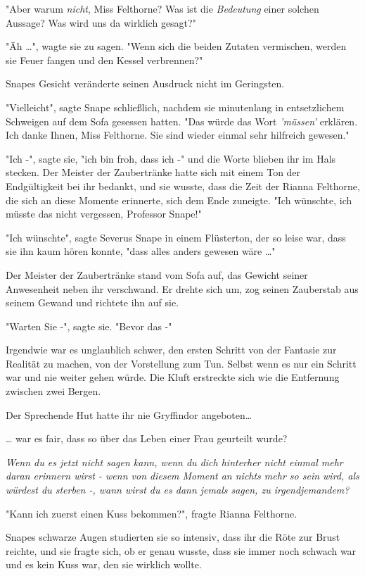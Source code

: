 {"Aber warum \emph{nicht}, Miss Felthorne? Was ist die \emph{Bedeutung} einer solchen Aussage? Was wird uns da wirklich gesagt?"

"Äh …", wagte sie zu sagen. "Wenn sich die beiden Zutaten vermischen, werden sie Feuer fangen und den Kessel verbrennen?"

Snapes Gesicht veränderte seinen Ausdruck nicht im Geringsten.

"Vielleicht", sagte Snape schließlich, nachdem sie minutenlang in entsetzlichem Schweigen auf dem Sofa gesessen hatten. "Das würde das Wort \emph{'müssen'} erklären. Ich danke Ihnen, Miss Felthorne. Sie sind wieder einmal sehr hilfreich gewesen."

"Ich -", sagte sie, "ich bin froh, dass ich -" und die Worte blieben ihr im Hals stecken. Der Meister der Zaubertränke hatte sich mit einem Ton der Endgültigkeit bei ihr bedankt, und sie wusste, dass die Zeit der Rianna Felthorne, die sich an diese Momente erinnerte, sich dem Ende zuneigte. "Ich wünschte, ich müsste das nicht vergessen, Professor Snape!"

"Ich wünschte", sagte Severus Snape in einem Flüsterton, der so leise war, dass sie ihn kaum hören konnte, "dass alles anders gewesen wäre …"

Der Meister der Zaubertränke stand vom Sofa auf, das Gewicht seiner Anwesenheit neben ihr verschwand. Er drehte sich um, zog seinen Zauberstab aus seinem Gewand und richtete ihn auf sie.

"Warten Sie -", sagte sie. "Bevor das -"

Irgendwie war es unglaublich schwer, den ersten Schritt von der Fantasie zur Realität zu machen, von der Vorstellung zum Tun. Selbst wenn es nur ein Schritt war und nie weiter gehen würde. Die Kluft erstreckte sich wie die Entfernung zwischen zwei Bergen.

Der Sprechende Hut hatte ihr nie Gryffindor angeboten…

… war es fair, dass so über das Leben einer Frau geurteilt wurde?

\emph{\emph{Wenn} \emph{du} \emph{es jetzt nicht sagen kann, wenn} \emph{du dich hinterher nicht einmal mehr daran erinnern wirst} \emph{- wenn von diesem Moment an nichts mehr so sein wird, als würdest du} \emph{sterben -, wann wirst du} \emph{es dann jemals sagen, zu irgendjemandem?}}

"Kann ich zuerst einen Kuss bekommen?", fragte Rianna Felthorne.

Snapes schwarze Augen studierten sie so intensiv, dass ihr die Röte zur Brust reichte, und sie fragte sich, ob er genau wusste, dass sie immer noch schwach war und es kein Kuss war, den sie wirklich wollte.

}
